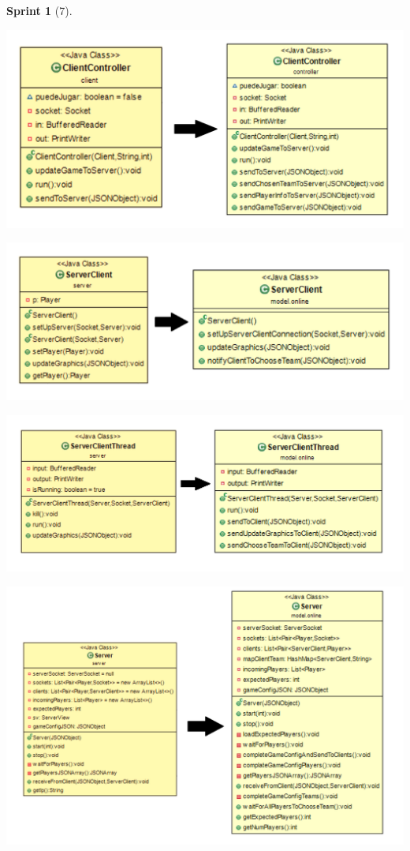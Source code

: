 \documentclass[12pt,a4paper,openright]{book}
\theoremstyle{break}
\newtheorem*{sprint}{Sprint}
\begin{document}
\begin{sprint}[7]
\begin{center}
\includegraphics[scale=0.3]{ClientController-evol.png} 
\end{center}

\begin{center}
\includegraphics[scale=0.3]{ServerClient-evol.png} 
\end{center}

\begin{center}
\includegraphics[scale=0.3]{ServerClientThread-evol.png} 
\end{center}

\begin{center}
\includegraphics[scale=0.3]{server-evol.png} 
\end{center}


\end{sprint}
\end{document}
